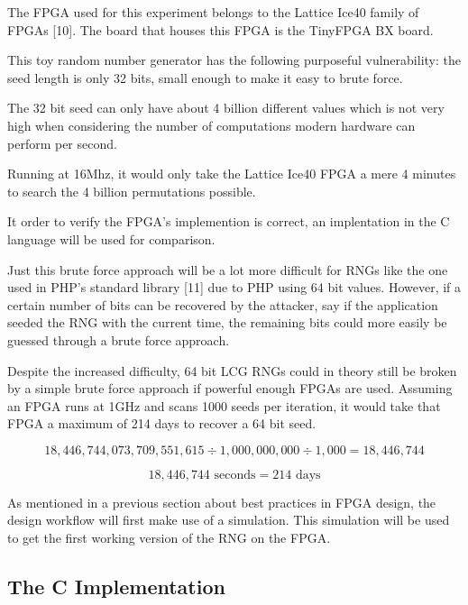 \documentclass{article}
\begin{document}
    The FPGA used for this experiment belongs to the Lattice Ice40 family of FPGAs [10].
    The board that houses this FPGA is the TinyFPGA BX board.

    This toy random number generator has the following purposeful vulnerability:
    the seed length is only 32 bits, small enough to make it easy to brute force.

    The 32 bit seed can only have about 4 billion different values which
    is not very high when considering the number of computations modern hardware can perform
    per second.

    Running at 16Mhz, it would only take the Lattice Ice40 FPGA
    a mere 4 minutes to search the 4 billion permutations possible.

    It order to verify the FPGA's implemention is correct, an implentation in the C
    language will be used for comparison.

    Just this brute force approach will be a lot more difficult for RNGs like the one used
    in PHP's standard library [11] due to PHP using 64 bit values.
    However, if a certain number of bits can be recovered by the attacker,
    say if the application seeded the RNG with the current time,
    the remaining bits could more easily be guessed through a brute force approach.

    Despite the increased difficulty, 64 bit LCG RNGs could in theory still
    be broken by a simple brute force approach if powerful enough FPGAs are used.
    Assuming an FPGA runs at 1GHz and scans 1000 seeds per iteration, it would
    take that FPGA a maximum of 214 days to recover a 64 bit seed.

    \[ 18,446,744,073,709,551,615 \div 1,000,000,000 \div 1,000 = 18,446,744 \]

    \[ 18,446,744 \text{ seconds} = 214 \text{ days} \]

    As mentioned in a previous section about best practices in FPGA design,
    the design workflow will first make use of a simulation.
    This simulation will be used to get the first working version of the RNG
    on the FPGA.

    \break

    \subsection{The C Implementation}

    \lstset{language=C}
\end{document}
